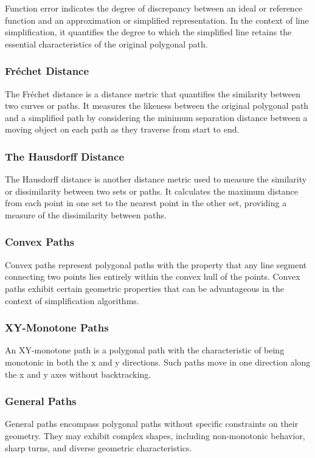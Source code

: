 Function error indicates the degree of discrepancy between an ideal or reference function and an approximation or simplified representation. In the context of line simplification, it quantifies the degree to which the simplified line retains the essential characteristics of the original polygonal path.

\subsubsection{Fréchet Distance}

The Fréchet distance is a distance metric that quantifies the similarity between two curves or paths. It measures the likeness between the original polygonal path and a simplified path by considering the minimum separation distance between a moving object on each path as they traverse from start to end.


\subsubsection{The Hausdorff Distance}

The Hausdorff distance is another distance metric used to measure the similarity or dissimilarity between two sets or paths. It calculates the maximum distance from each point in one set to the nearest point in the other set, providing a measure of the dissimilarity between paths.


\subsubsection{Convex Paths}

Convex paths represent polygonal paths with the property that any line segment connecting two points lies entirely within the convex hull of the points. Convex paths exhibit certain geometric properties that can be advantageous in the context of simplification algorithms.

\subsubsection{XY-Monotone Paths}

An XY-monotone path is a polygonal path with the characteristic of being monotonic in both the x and y directions. Such paths move in one direction along the x and y axes without backtracking.

\subsubsection{General Paths}

General paths encompass polygonal paths without specific constraints on their geometry. They may exhibit complex shapes, including non-monotonic behavior, sharp turns, and diverse geometric characteristics.

\fi
